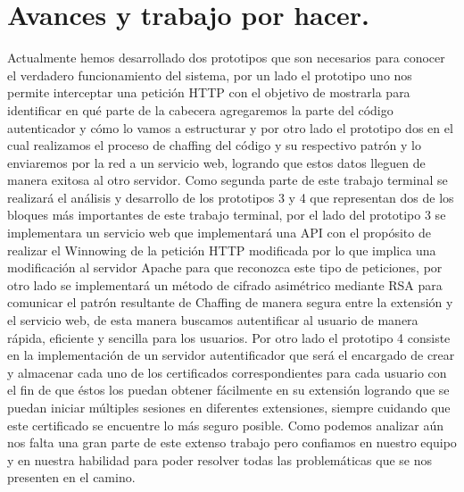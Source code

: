\documentclass[12pt, a4paper, titlepage]{report}
\begin{document}
	\chapter{\textcolor{azulescom}{Avances y trabajo por hacer.}}
	    Actualmente hemos desarrollado dos prototipos que son necesarios para conocer el verdadero funcionamiento del sistema, por un lado el prototipo uno nos permite interceptar una petici\'on HTTP con el objetivo de mostrarla para identificar en qué parte de la cabecera agregaremos la parte del código autenticador y c\'omo lo vamos a estructurar y por otro lado el prototipo dos en el cual realizamos el proceso de chaffing del código y su respectivo patr\'on y lo enviaremos por la red a un servicio web, logrando que estos datos lleguen de manera exitosa al otro servidor.
	    Como segunda parte de este trabajo terminal se realizará el análisis y desarrollo de los prototipos 3 y 4 que representan dos de los bloques más importantes de este trabajo terminal, por el lado del prototipo 3 se implementara un servicio web que implementará una API con el propósito de realizar el Winnowing de la petición HTTP modificada por lo que implica una modificación al servidor Apache para que reconozca este tipo de peticiones, por otro lado se implementará un método de cifrado asimétrico mediante RSA para comunicar el patrón resultante de Chaffing de manera segura entre la extensión y el servicio web, de esta manera buscamos autentificar al usuario de manera rápida, eficiente y sencilla para los usuarios. Por otro lado el prototipo 4 consiste en la implementación de un servidor autentificador que será el encargado de crear y  almacenar cada uno de los certificados correspondientes para cada usuario con el fin de que éstos los puedan obtener fácilmente en su extensión logrando que se puedan iniciar múltiples sesiones en diferentes extensiones, siempre cuidando que este certificado se encuentre lo más seguro posible.
	    Como podemos analizar aún nos falta una gran parte de este extenso trabajo pero confiamos en nuestro equipo y en nuestra habilidad para poder resolver todas las problemáticas que se nos presenten en el camino.
	\newpage
	
\end{document}
